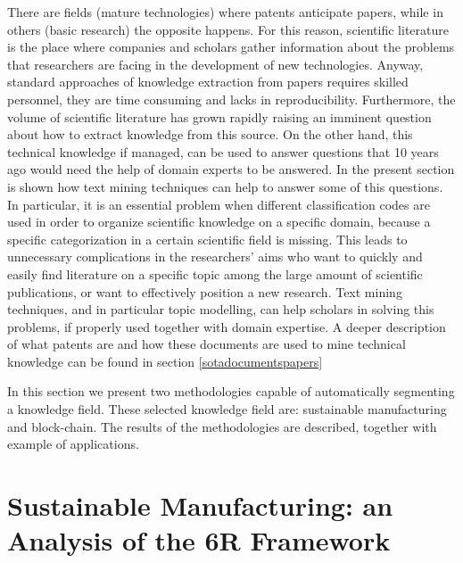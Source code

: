 \documentclass[]{book}
\theoremstyle{definition}
\theoremstyle{definition}
\theoremstyle{definition}
\theoremstyle{remark}
\begin{document}
There are fields (mature technologies) where patents anticipate papers,
while in others (basic research) the opposite happens. For this reason,
scientific literature is the place where companies and scholars gather
information about the problems that researchers are facing in the
development of new technologies. Anyway, standard approaches of
knowledge extraction from papers requires skilled personnel, they are
time consuming and lacks in reproducibility. Furthermore, the volume of
scientific literature has grown rapidly raising an imminent question
about how to extract knowledge from this source. On the other hand, this
technical knowledge if managed, can be used to answer questions that 10
years ago would need the help of domain experts to be answered. In the
present section is shown how text mining techniques can help to answer
some of this questions. In particular, it is an essential problem when
different classification codes are used in order to organize scientific
knowledge on a specific domain, because a specific categorization in a
certain scientific field is missing. This leads to unnecessary
complications in the researchers' aims who want to quickly and easily
find literature on a specific topic among the large amount of scientific
publications, or want to effectively position a new research. Text
mining techniques, and in particular topic modelling, can help scholars
in solving this problems, if properly used together with domain
expertise. A deeper description of what patents are and how these
documents are used to mine technical knowledge can be found in section
\ref{sotadocumentspapers}

In this section we present two methodologies capable of automatically
segmenting a knowledge field. These selected knowledge field are:
sustainable manufacturing and block-chain. The results of the
methodologies are described, together with example of applications.

\section{Sustainable Manufacturing: an Analysis of the 6R
Framework}\label{smtextdrivenbottomup}
\end{document}
